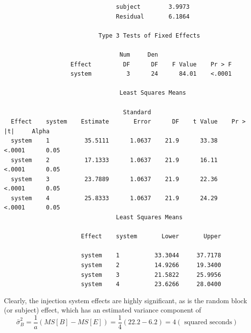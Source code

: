 \begin{large}
\begin{verbatim}
                                subject        3.9973
                                Residual       6.1864
                                                                                
                           Type 3 Tests of Fixed Effects
 
                                 Num     Den
                   Effect         DF      DF    F Value    Pr > F
                   system          3      24      84.01    <.0001

                                 Least Squares Means
 
                                  Standard
  Effect    system    Estimate       Error      DF    t Value    Pr > |t|     Alpha
  system    1          35.5111      1.0637    21.9      33.38      <.0001      0.05
  system    2          17.1333      1.0637    21.9      16.11      <.0001      0.05
  system    3          23.7889      1.0637    21.9      22.36      <.0001      0.05
  system    4          25.8333      1.0637    21.9      24.29      <.0001      0.05
                                Least Squares Means
 
                      Effect    system       Lower       Upper

                      system    1          33.3044     37.7178
                      system    2          14.9266     19.3400
                      system    3          21.5822     25.9956
                      system    4          23.6266     28.0400
\end{verbatim}
\end{large}
\bigkn
Clearly, the injection system effects are highly significant, as
is the random block (or subject) effect, which has an estimated
variance component of 
$$ \hat{\sigma}_B^2 = \frac{1}{a}(MS[B]-MS[E]) = \frac{1}{4}(22.2-6.2)=4 (\mbox{ squared seconds})$$
\newpage
